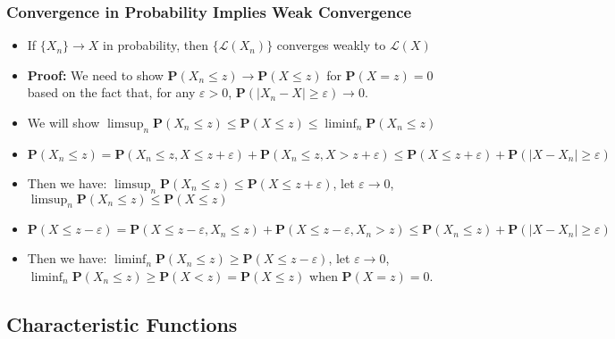 \documentclass[handout]{beamer}
\newcommand{\BP}{\mathbf{P}}
\begin{document}
\frame
{
  \frametitle{Convergence in Probability Implies Weak Convergence} 

\begin{itemize}
          
                     
\item<1->[] \begin{Theorem} If $\{X_n\}\rightarrow X$ in probability, then $\{ \mathcal{L} (X_n) \}$ converges weakly to $\mathcal{L} (X)$ \end{Theorem}  
                     
\item<2->\textbf{Proof:} We need to show $\BP(X_n\leq z)\rightarrow \BP(X\leq z)$ for $\BP(X=z)=0$ based on the fact that, for any $\varepsilon>0$, $\BP(|X_n-X| \geq \varepsilon) \rightarrow 0.$

\item<3-> We will show $\limsup_n \BP(X_n\leq z) \le \BP(X\leq z) \le \liminf_n \BP(X_n\leq z)$
                     
\item<4->[-] $\BP(X_n\leq z)=\BP(X_n\leq z, X\leq z+\varepsilon)+\BP(X_n\leq z, X> z+\varepsilon) \leq \BP(X\leq z+\varepsilon)+\BP(|X-X_n| \geq \varepsilon)$

\item<5->[-] Then we have: $\limsup_n \BP(X_n\leq z) \leq \BP(X\leq z+\varepsilon)$, let $\varepsilon\rightarrow 0$, $\limsup_n \BP(X_n\leq z) \leq \BP(X\leq z)$

\item<6->[-] $\BP(X \leq z-\varepsilon)=\BP(X \leq z-\varepsilon, X_n \leq z)+\BP(X \leq z-\varepsilon, X_n> z) \leq \BP(X_n \leq z)+\BP(|X-X_n| \geq \varepsilon)$

\item<7->[-] Then we have: $\liminf_n \BP(X_n\leq z) \geq \BP(X\leq z-\varepsilon)$, let $\varepsilon\rightarrow 0$, $\liminf_n \BP(X_n\leq z) \geq \BP(X< z)=\BP(X\leq z)$ when $\BP(X=z)=0$. 


\end{itemize}
}

\subsection{Characteristic Functions}
\end{document}
